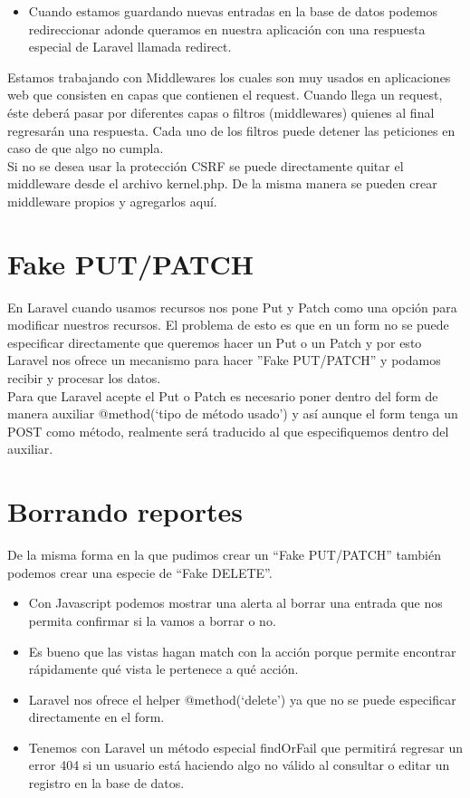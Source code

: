 \documentclass{article}
\begin{document}
\begin{itemize}
  \item Cuando estamos guardando nuevas entradas en la base de datos podemos
    redireccionar adonde queramos en nuestra aplicación con una respuesta
    especial de Laravel llamada redirect.
\end{itemize}

Estamos trabajando con Middlewares los cuales son muy usados en aplicaciones
web que consisten en capas que contienen el request. Cuando llega un request,
éste deberá pasar por diferentes capas o filtros (middlewares) quienes al final
regresarán una respuesta. Cada uno de los filtros puede detener las peticiones
en caso de que algo no cumpla.\\

Si no se desea usar la protección CSRF se puede directamente quitar el
middleware desde el archivo kernel.php. De la misma manera se pueden crear
middleware propios y agregarlos aquí.\\

\section{Fake PUT/PATCH}%
En Laravel cuando usamos recursos nos pone Put y Patch como una opción para
modificar nuestros recursos. El problema de esto es que en un form no se puede
especificar directamente que queremos hacer un Put o un Patch y por esto
Laravel nos ofrece un mecanismo para hacer ”Fake PUT/PATCH” y podamos recibir y
procesar los datos.\\

Para que Laravel acepte el Put o Patch es necesario poner dentro del form de
manera auxiliar @method(‘tipo de método usado’) y así aunque el form tenga un
POST como método, realmente será traducido al que especifiquemos dentro del
auxiliar.\\


\section{Borrando reportes}%
De la misma forma en la que pudimos crear un “Fake PUT/PATCH” también podemos
crear una especie de “Fake DELETE”.\\

\begin{itemize}
  \item Con Javascript podemos mostrar una alerta al borrar una entrada que nos
    permita confirmar si la vamos a borrar o no.
  \item Es bueno que las vistas hagan match con la acción porque permite
    encontrar rápidamente qué vista le pertenece a qué acción.
  \item Laravel nos ofrece el helper @method(‘delete’) ya que no se puede
    especificar directamente en el form.
  \item Tenemos con Laravel un método especial findOrFail que permitirá
    regresar un error 404 si un usuario está haciendo algo no válido al
    consultar o editar un registro en la base de datos.
\end{itemize}
\end{document}
